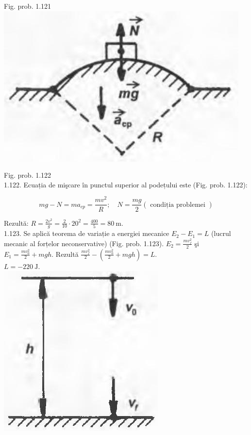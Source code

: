 \documentclass[10pt]{article}
\begin{document}
Fig. prob. 1.121\\
\includegraphics[max width=\textwidth, center]{2025_07_01_5b3ff9fa0d508c8e9f17g-223(1)}

Fig. prob. 1.122\\
1.122. Ecuația de mişcare în punctul superior al podețului este (Fig. prob. 1.122):

$$
m g-N=m a_{c p}=\frac{m v^{2}}{R} ; \quad N=\frac{m g}{2}(\text { condiția problemei })
$$

Rezultă: $R=\frac{2 v^{2}}{g}=\frac{2}{10} \cdot 20^{2}=\frac{400}{5}=80 \mathrm{~m}$.\\
1.123. Se aplică teorema de variație a energiei mecanice $E_{2}-E_{1}=L$ (lucrul mecanic al forțelor neconservative) (Fig. prob. 1.123). $E_{2}=\frac{m v_{f}^{2}}{2}$ şi $E_{1}=\frac{m v_{0}^{2}}{2}+m g h$. Rezultă $\frac{m v_{f}^{2}}{2}-\left(\frac{m v_{0}^{2}}{2}+m g h\right)=L$.\\
$L=-220 \mathrm{~J}$.\\
\includegraphics[max width=\textwidth, center]{2025_07_01_5b3ff9fa0d508c8e9f17g-224}
\end{document}
